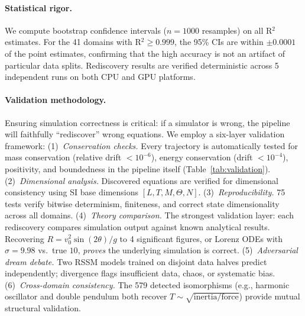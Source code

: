\documentclass{article}
\begin{document}
\paragraph{Statistical rigor.}
We compute bootstrap confidence intervals ($n = 1000$ resamples) on
all R$^2$ estimates. For the 41 domains with R$^2 \geq 0.999$, the
95\% CIs are within $\pm 0.0001$ of the point estimates, confirming
that the high accuracy is not an artifact of particular data splits.
Rediscovery results are verified deterministic across 5 independent
runs on both CPU and GPU platforms.


\paragraph{Validation methodology.}
Ensuring simulation correctness is critical: if a simulator is wrong,
the pipeline will faithfully ``rediscover'' wrong equations.
We employ a six-layer validation framework:
(1)~\emph{Conservation checks.}
Every trajectory is automatically tested for mass conservation
(relative drift $< 10^{-6}$), energy conservation (drift $< 10^{-4}$),
positivity, and boundedness in the pipeline itself (Table~\ref{tab:validation}).
(2)~\emph{Dimensional analysis.}
Discovered equations are verified for dimensional consistency using
SI base dimensions $[L, T, M, \Theta, N]$.
(3)~\emph{Reproducibility.}
75 tests verify bitwise determinism, finiteness, and correct state
dimensionality across all domains.
(4)~\emph{Theory comparison.}
The strongest validation layer: each rediscovery compares simulation
output against known analytical results. Recovering $R = v_0^2 \sin(2\theta)/g$
to 4 significant figures, or Lorenz ODEs with $\sigma = 9.98$ vs.\ true $10$,
\emph{proves} the underlying simulation is correct.
(5)~\emph{Adversarial dream debate.}
Two RSSM models trained on disjoint data halves predict independently;
divergence flags insufficient data, chaos, or systematic bias.
(6)~\emph{Cross-domain consistency.}
The 579 detected isomorphisms (e.g., harmonic oscillator and double
pendulum both recover $T \sim \sqrt{\text{inertia}/\text{force}}$)
provide mutual structural validation.
\end{document}
